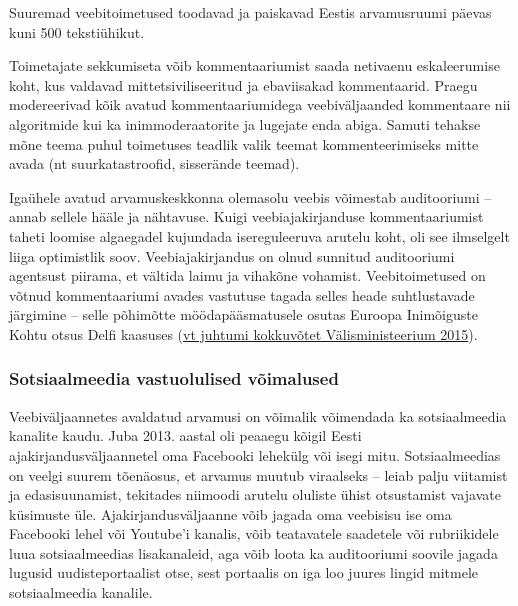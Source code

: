\documentclass[estonian,]{article}
\begin{document}
\begin{blockquote-right}
Suuremad veebitoimetused toodavad ja paiskavad Eestis arvamusruumi
päevas kuni 500 tekstiühikut.
\end{blockquote-right}

Toimetajate sekkumiseta võib kommentaariumist saada netivaenu eskaleerumise koht, kus valdavad mittetsiviliseeritud ja ebaviisakad kommentaarid. Praegu modereerivad kõik avatud kommentaariumidega veebiväljaanded kommentaare nii algoritmide kui ka inimmoderaatorite ja lugejate enda abiga. Samuti tehakse mõne teema puhul toimetuses teadlik valik teemat kommenteerimiseks mitte avada (nt suurkatastroofid, sisserände teemad).

Igaühele avatud arvamuskeskkonna olemasolu veebis võimestab auditooriumi -- annab sellele hääle ja nähtavuse. Kuigi veebiajakirjanduse kommentaariumist taheti loomise algaegadel kujundada isereguleeruva arutelu koht, oli see ilmselgelt liiga optimistlik soov. Veebiajakirjandus on olnud sunnitud auditooriumi agentsust piirama, et vältida laimu ja vihakõne vohamist. Veebitoimetused on võtnud kommentaariumi avades vastutuse tagada selles heade suhtlustavade järgimine -- selle põhimõtte möödapääsmatusele osutas Euroopa Inimõiguste Kohtu otsus Delfi kaasuses (\protect\hyperlink{Vuxe4lisministeerium2015}{vt juhtumi kokkuvõtet Välisministeerium 2015}).

\hypertarget{sotsiaalmeedia-vastuolulised-vuxf5imalused}{%
\subsubsection*{Sotsiaalmeedia vastuolulised võimalused}\label{sotsiaalmeedia-vastuolulised-vuxf5imalused}}

Veebiväljaannetes avaldatud arvamusi on võimalik võimendada ka sotsiaalmeedia kanalite kaudu. Juba 2013. aastal oli peaaegu kõigil Eesti ajakirjandusväljaannetel oma Facebooki lehekülg või isegi mitu. Sotsiaalmeedias on veelgi suurem tõenäosus, et arvamus muutub viraalseks -- leiab palju viitamist ja edasisuunamist, tekitades niimoodi arutelu oluliste ühist otsustamist vajavate küsimuste üle. Ajakirjandusväljaanne võib jagada oma veebisisu ise oma Facebooki lehel või Youtube'i kanalis, võib teatavatele saadetele või rubriikidele luua sotsiaalmeedias lisakanaleid, aga võib loota ka auditooriumi soovile jagada lugusid uudisteportaalist otse, sest portaalis on iga loo juures lingid mitmele sotsiaalmeedia kanalile.
\end{document}
